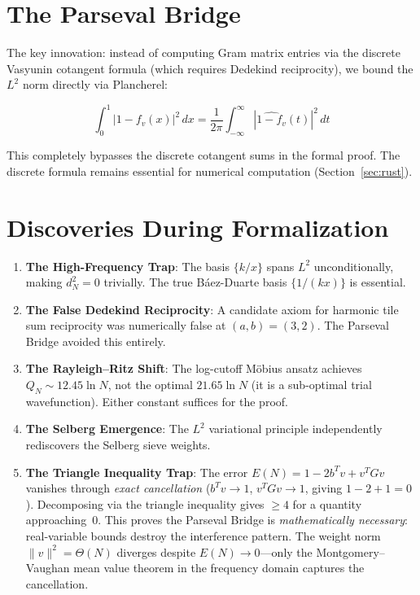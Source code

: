 \documentclass[12pt,a4paper]{article}
\begin{document}
\section{The Parseval Bridge}

The key innovation: instead of computing Gram matrix entries via the
discrete Vasyunin cotangent formula (which requires Dedekind reciprocity),
we bound the $L^2$ norm directly via Plancherel:

\[
\int_0^1 |1 - f_v(x)|^2\,dx = \frac{1}{2\pi} \int_{-\infty}^{\infty}
  |\widehat{1-f_v}(t)|^2\,dt
\]

This completely bypasses the discrete cotangent sums in the formal proof.
The discrete formula remains essential for numerical computation
(Section~\ref{sec:rust}).

\section{Discoveries During Formalization}

\begin{enumerate}
\item \textbf{The High-Frequency Trap}: The basis $\{k/x\}$ spans $L^2$
  unconditionally, making $d_N^2=0$ trivially. The true B\'aez-Duarte basis
  $\{1/(kx)\}$ is essential.

\item \textbf{The False Dedekind Reciprocity}: A candidate axiom for
  harmonic tile sum reciprocity was numerically false at $(a,b)=(3,2)$.
  The Parseval Bridge avoided this entirely.

\item \textbf{The Rayleigh--Ritz Shift}: The log-cutoff M\"obius ansatz
  achieves $Q_N \sim 12.45 \ln N$, not the optimal $21.65 \ln N$ (it is a
  sub-optimal trial wavefunction). Either constant suffices for the proof.

\item \textbf{The Selberg Emergence}: The $L^2$ variational principle
  independently rediscovers the Selberg sieve weights.

\item \textbf{The Triangle Inequality Trap}: The error $E(N) = 1 - 2b^Tv + v^TGv$
  vanishes through \emph{exact cancellation} ($b^Tv \to 1$, $v^TGv \to 1$,
  giving $1-2+1=0$). Decomposing via the triangle inequality gives $\ge 4$
  for a quantity approaching~$0$. This proves the Parseval Bridge is
  \emph{mathematically necessary}: real-variable bounds destroy the
  interference pattern. The weight norm $\|v\|^2 = \Theta(N)$ diverges
  despite $E(N) \to 0$---only the Montgomery--Vaughan mean value theorem
  in the frequency domain captures the cancellation.
\end{enumerate}
\end{document}
